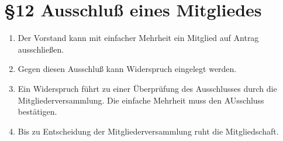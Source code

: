 \section*{§12 Ausschluß eines Mitgliedes}
\begin{enumerate}
\item Der Vorstand kann mit einfacher Mehrheit ein Mitglied auf Antrag ausschließen.
\item Gegen diesen Ausschluß kann Widerspruch eingelegt werden.
\item Ein Widerspruch führt zu einer Überprüfung des Ausschlusses durch
die Mitgliederversammlung. Die einfache Mehrheit muss den AUsschluss
bestätigen.
\item Bis zu Entscheidung der Mitgliederversammlung ruht die Mitgliedschaft.
\end{enumerate}
